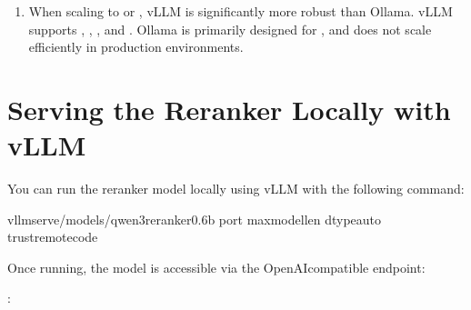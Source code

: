 \documentclass[letterpaper,10pt,english]{sphinxmanual}
\begin{document}
\begin{enumerate}
\item {} 
\sphinxAtStartPar
{}
\sphinxhyphen{} When scaling to  or , vLLM is significantly more robust than Ollama.
\sphinxhyphen{} vLLM supports , , , and .
\sphinxhyphen{} Ollama is primarily designed for , and does not scale efficiently in production environments.

\end{enumerate}


\section{Serving the Reranker Locally with vLLM}
\label{\detokenize{vllm:serving-the-reranker-locally-with-vllm}}
\sphinxAtStartPar
You can run the reranker model locally using vLLM with the following command:

\begin{sphinxVerbatim}[commandchars=\\\{\}]
vllmserve/models/qwen3\PYGZhy{}reranker\PYGZhy{}0.6b
\PYGZhy{}\PYGZhy{}port
\PYGZhy{}\PYGZhy{}max\PYGZhy{}model\PYGZhy{}len
\PYGZhy{}\PYGZhy{}dtypeauto
\PYGZhy{}\PYGZhy{}trust\PYGZhy{}remote\PYGZhy{}code
\end{sphinxVerbatim}

\sphinxAtStartPar
Once running, the model is accessible via the OpenAI\sphinxhyphen{}compatible endpoint:

\sphinxAtStartPar
{} 

\sphinxAtStartPar
{}:
\end{document}
